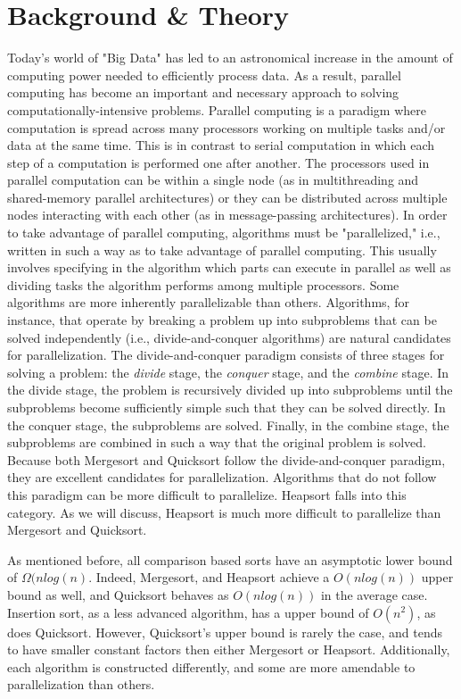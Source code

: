 \documentclass[conference]{IEEEtran}
\begin{document}
    \section{Background \& Theory}
    Today's world of "Big Data" has led to an astronomical increase in the amount of computing power needed to efficiently process data.
    As a result, parallel computing has become an important and necessary approach to solving computationally-intensive problems.
    Parallel computing is a paradigm where computation is spread across many processors working on multiple tasks and/or data at the same time. This is in contrast to serial computation in which each step of a computation is performed one after another.
    The processors used in parallel computation can be within a single node (as in multithreading and shared-memory parallel architectures) or they can be distributed across multiple nodes interacting with each other (as in message-passing architectures). In order to take advantage of parallel computing, algorithms must be "parallelized," i.e., written in such a way as to take advantage of parallel computing. This usually involves specifying in the algorithm which parts can execute in parallel as well as dividing tasks the algorithm performs among multiple processors. Some algorithms are more inherently parallelizable than others. Algorithms, for instance, that operate by breaking a problem up into subproblems that can be solved independently (i.e., divide-and-conquer algorithms) are natural candidates for parallelization. The divide-and-conquer paradigm consists of three stages for solving a problem: the \textit{divide} stage, the \textit{conquer} stage, and the \textit{combine} stage. In the divide stage, the problem is recursively divided up into subproblems until the subproblems become sufficiently simple such that they can be solved directly. In the conquer stage, the subproblems are solved. Finally, in the combine stage, the subproblems are combined in such a way that the original problem is solved. Because both Mergesort and Quicksort follow the divide-and-conquer paradigm, they are excellent candidates for parallelization. Algorithms that do not follow this paradigm can be more difficult to parallelize. Heapsort falls into this category. As we will discuss, Heapsort is much more difficult to parallelize than Mergesort and Quicksort.
    
    As mentioned before, all comparison based sorts have an asymptotic lower bound of $\Omega(nlog(n)$. 
    Indeed,  Mergesort, and Heapsort achieve a $O(nlog(n))$ upper bound as well, and Quicksort behaves as $O(nlog(n))$ in the average case. 
    Insertion sort, as a less advanced algorithm, has a upper bound of $O(n^2)$, as does Quicksort. \cite{cormen_introduction_2009} 
    However, Quicksort's upper bound is rarely the case, and tends to have smaller constant factors then either Mergesort or Heapsort. \cite{hoare_algorithm_1961} %
    Additionally, each algorithm is constructed differently, and some are more amendable to parallelization than others.
    
\end{document}

